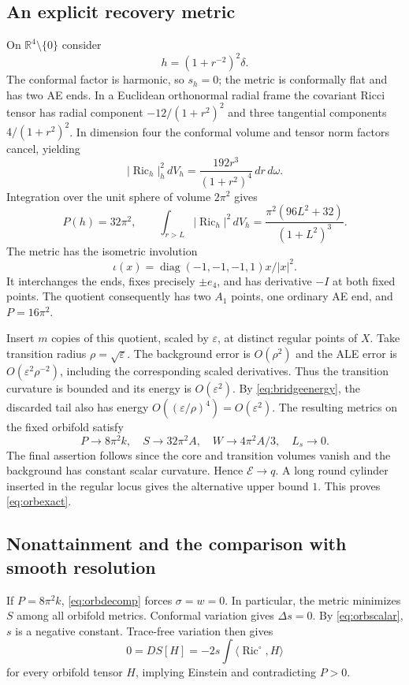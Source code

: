 \documentclass[11pt,a4paper]{article}
\theoremstyle{definition}\newtheorem{definition}[theorem]{Definition}
\theoremstyle{remark}\newtheorem{remark}[theorem]{Remark}
\newcommand{\Ric}{\operatorname{Ric}}
\newcommand{\R}{\mathbb R}
\newcommand{\E}{\mathcal E}
\newcommand{\eps}{\varepsilon}
\newcommand{\dd}{\,dV}
\newcommand{\ip}[2]{\langle #1,#2\rangle}
\begin{document}
\subsection{An explicit recovery metric}
On $\R^4\setminus\{0\}$ consider
\begin{equation}\label{eq:bridge}
 h=(1+r^{-2})^2\delta.
\end{equation}
The conformal factor is harmonic, so $s_h=0$; the metric is conformally flat and has two AE ends. In a Euclidean orthonormal radial frame the covariant Ricci tensor has radial component
$-12/(1+r^2)^2$ and three tangential components $4/(1+r^2)^2$. In dimension four the conformal volume and tensor norm factors cancel, yielding
\[
 |\Ric_h|_h^2\dd_h=\frac{192r^3}{(1+r^2)^4}\,dr\,d\omega.
\]
Integration over the unit sphere of volume $2\pi^2$ gives
\begin{equation}\label{eq:bridgeenergy}
 P(h)=32\pi^2,\qquad
 \int_{r>L}|\Ric_h|^2\dd_h
 =\frac{\pi^2(96L^2+32)}{(1+L^2)^3}.
\end{equation}
The metric has the isometric involution
\[
 \iota(x)=\operatorname{diag}(-1,-1,-1,1)x/|x|^2.
\]
It interchanges the ends, fixes precisely $\pm e_4$, and has derivative $-I$ at both fixed points. The quotient consequently has two $A_1$ points, one ordinary AE end, and $P=16\pi^2$.

Insert $m$ copies of this quotient, scaled by $\eps$, at distinct regular points of $X$. Take transition radius $\rho=\sqrt\eps$. The background error is $O(\rho^2)$ and the ALE error is $O(\eps^2\rho^{-2})$, including the corresponding scaled derivatives. Thus the transition curvature is bounded and its energy is $O(\eps^2)$. By \eqref{eq:bridgeenergy}, the discarded tail also has energy $O((\eps/\rho)^4)=O(\eps^2)$. The resulting metrics on the fixed orbifold satisfy
\begin{equation}\label{eq:orbrecovery}
 P\to8\pi^2k,\quad S\to32\pi^2A,\quad
 W\to4\pi^2A/3,\quad L_s\to0.
\end{equation}
The final assertion follows since the core and transition volumes vanish and the background has constant scalar curvature. Hence $\E\to q$. A long round cylinder inserted in the regular locus gives the alternative upper bound $1$. This proves \eqref{eq:orbexact}.

\subsection{Nonattainment and the comparison with smooth resolution}
If $P=8\pi^2k$, \eqref{eq:orbdecomp} forces $\sigma=w=0$. In particular, the metric minimizes $S$ among all orbifold metrics. Conformal variation gives $\Delta s=0$. By \eqref{eq:orbscalar}, $s$ is a negative constant. Trace-free variation then gives
\[
 0=DS[H]=-2s\int\ip{\Ric^\circ}{H}
\]
for every orbifold tensor $H$, implying Einstein and contradicting $P>0$.
\end{document}
